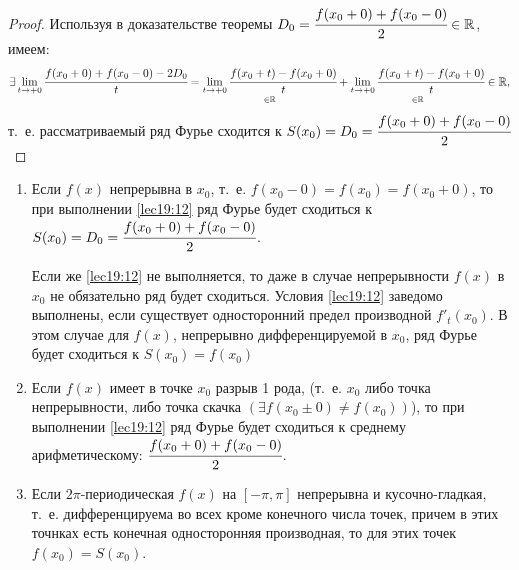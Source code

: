 \documentclass[../../main.tex]{subfiles}
\begin{document}
	
		\begin{proof}
		Используя в доказательстве теоремы
		 $D_0=\cfrac{f(x_0+0)+f(x_0-0)}{2}\in\mathbb{R}$, имеем:
		\[
		\exists\lim_{t\rightarrow+0}\cfrac{f(x_0+0)+f(x_0-0)-2D_0}{t}=
		\underset{\in\mathbb{R}}{\lim_{t\rightarrow+0}\cfrac{f(x_0+t)-f(x_0+0)}{t}}
		+\underset{\in\mathbb{R}}{\lim_{t\rightarrow+0}\cfrac{f(x_0+t)-f(x_0+0)}{t}}\in\mathbb{R},
		\]
		т.~е. рассматриваемый ряд Фурье сходится к 
		$S(x_0)=D_0=\cfrac{f(x_0+0)+f(x_0-0)}{2}$ 
	\end{proof}	
	
	\begin{rems}
		\begin{enumerate}
			\item Если $f(x)$ непрерывна в $x_0$, т.~е.
			 $f(x_0-0)=f(x_0)=f(x_0+0)$, то при выполнении \ref{lec19:12}
			ряд Фурье будет сходиться к $S(x_0)=D_0=\cfrac{f(x_0+0)+f(x_0-0)}{2}$.
			
			Если же \ref{lec19:12} не выполняется, то даже в случае
			непрерывности $f(x)$ в $x_0$ не обязательно ряд будет сходиться.
			Условия \ref{lec19:12} заведомо выполнены, если существует 
			односторонний предел производной $f'_t(x_0)$. В этом случае для 
			$f(x)$, непрерывно дифференцируемой в $x_0$, ряд Фурье будет 
			сходиться к $S(x_0)=f(x_0)$
			\item Если $f(x)$ имеет в точке $x_0$ разрыв 1 рода, 
			(т.~е. $x_0$ либо точка непрерывности, либо точка скачка 
			$(\exists f(x_0\pm0)\neq f(x_0))$\;), то при выполнении 
			\ref{lec19:12} ряд Фурье будет сходиться к среднему 
			арифметическому: $\cfrac{f(x_0+0)+f(x_0-0)}{2}$.
			
			\item Если $2\pi$-периодическая $f(x)$ на 
			$\left[-\pi,\pi \right]$ непрерывна и кусочно-гладкая, т.~е.
			дифференцируема во всех кроме конечного числа точек, причем
			в этих точнках есть конечная односторонняя производная, то для 
			этих точек $f(x_0)=S(x_0)$. 
		\end{enumerate}
	\end{rems}
\end{document}
